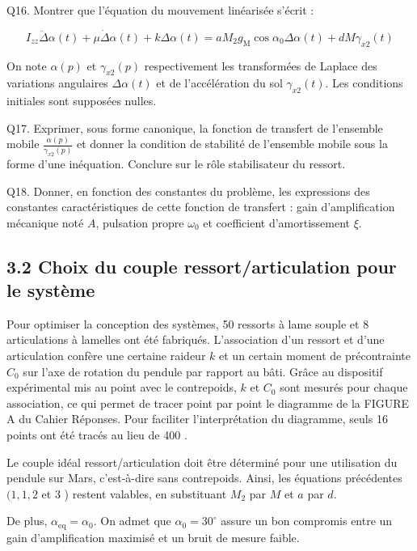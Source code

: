 \documentclass[10pt]{article}
\begin{document}
Q16. Montrer que l'équation du mouvement linéarisée s'écrit :


\begin{equation*}
I_{z z} \ddot{\Delta} \alpha(t)+\mu \dot{\Delta} \alpha(t)+k \Delta \alpha(t)=a M_{2} g_{\mathrm{M}} \cos \alpha_{0} \Delta \alpha(t)+d M \gamma_{x 2}(t) \tag{eq.3}
\end{equation*}


On note $\alpha(p)$ et $\gamma_{x 2}(p)$ respectivement les transformées de Laplace des variations angulaires $\Delta \alpha(t)$ et de l'accélération du sol $\gamma_{x 2}(t)$. Les conditions initiales sont supposées nulles.

Q17. Exprimer, sous forme canonique, la fonction de transfert de l'ensemble mobile $\frac{\alpha(p)}{\gamma_{x 2}(p)}$ et donner la condition de stabilité de l'ensemble mobile sous la forme d'une inéquation. Conclure sur le rôle stabilisateur du ressort.

Q18. Donner, en fonction des constantes du problème, les expressions des constantes caractéristiques de cette fonction de transfert : gain d'amplification mécanique noté $A$, pulsation propre $\omega_{0}$ et coefficient d'amortissement $\xi$.

\subsection*{3.2 Choix du couple ressort/articulation pour le système}
Pour optimiser la conception des systèmes, 50 ressorts à lame souple et 8 articulations à lamelles ont été fabriqués. L'association d'un ressort et d'une articulation confère une certaine raideur $k$ et un certain moment de précontrainte $C_{0}$ sur l'axe de rotation du pendule par rapport au bâti. Grâce au dispositif expérimental mis au point avec le contrepoids, $k$ et $C_{0}$ sont mesurés pour chaque association, ce qui permet de tracer point par point le diagramme de la FIGURE A du Cahier Réponses. Pour faciliter l'interprétation du diagramme, seuls 16 points ont été tracés au lieu de 400 .

Le couple idéal ressort/articulation doit être déterminé pour une utilisation du pendule sur Mars, c'est-à-dire sans contrepoids. Ainsi, les équations précédentes $(1,1,2$ et 3 ) restent valables, en substituant $M_{2}$ par $M$ et $a$ par $d$.

De plus, $\alpha_{\mathrm{eq}}=\alpha_{0}$. On admet que $\alpha_{0}=30^{\circ}$ assure un bon compromis entre un gain d'amplification maximisé et un bruit de mesure faible.
\end{document}
